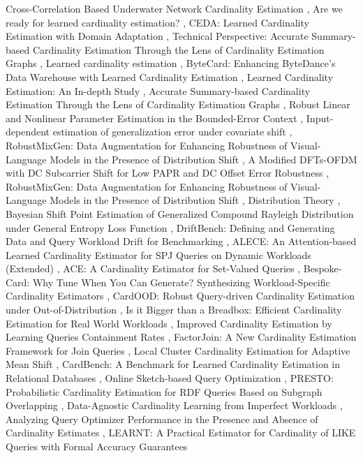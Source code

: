 \documentclass{article}
\begin{document}
Cross-Correlation Based Underwater Network Cardinality Estimation \cite{chowdhury2017optimization73ee3ac7}, Are we ready for learned cardinality estimation? \cite{wang2021readye3852374}, CEDA: Learned Cardinality Estimation with Domain Adaptation \cite{wang2023ceda70dc0332}, Technical Perspective: Accurate Summary-based Cardinality Estimation Through the Lens of Cardinality Estimation Graphs \cite{suciu2023technicale9ac173f}, Learned cardinality estimation \cite{sun2021learnedd25ede72}, ByteCard: Enhancing ByteDance's Data Warehouse with Learned Cardinality Estimation \cite{han2024bytecard9f89583d}, Learned Cardinality Estimation: An In-depth Study \cite{kim2022learnedd43db6c6}, Accurate Summary-based Cardinality Estimation Through the Lens of Cardinality Estimation Graphs \cite{chen2023accurate4a7d0f15}, Robust Linear and Nonlinear Parameter Estimation in the Bounded-Error Context \cite{walter1989robust2a039320}, Input-dependent estimation of generalization error under covariate shift \cite{sugiyama2005inputdependent41f87778}, RobustMixGen: Data Augmentation for Enhancing Robustness of Visual-Language Models in the Presence of Distribution Shift \cite{kim2023robustmixgenf75245e8}, A Modified DFTs-OFDM with DC Subcarrier Shift for Low PAPR and DC Offset Error Robustness \cite{nihei2015modified7cc5e598}, RobustMixGen: Data Augmentation for Enhancing Robustness of Visual-Language Models in the Presence of Distribution Shift \cite{kim2023robustmixgenb9ed7bbc}, Distribution Theory \cite{paper2015distributiond08466cc}, Bayesian Shift Point Estimation of Generalized Compound Rayleigh Distribution under General Entropy Loss Function \cite{srivastava2022bayesian02aadf1c}, DriftBench: Defining and Generating Data and Query Workload Drift for Benchmarking \cite{liu2025driftbench5dd7daaf}, ALECE: An Attention-based Learned Cardinality Estimator for SPJ Queries on Dynamic Workloads (Extended) \cite{li2023alecee0b086c2}, ACE: A Cardinality Estimator for Set-Valued Queries \cite{sheng2025ace126e83fe}, Bespoke-Card: Why Tune When You Can Generate? Synthesizing Workload-Specific Cardinality Estimators \cite{wehrstein2026bespokecard67eca848}, CardOOD: Robust Query-driven Cardinality Estimation under Out-of-Distribution \cite{li2024cardood5445da56}, Is it Bigger than a Breadbox: Efficient Cardinality Estimation for Real World Workloads \cite{yi2025biggerc72009ed}, Improved Cardinality Estimation by Learning Queries Containment Rates \cite{hayek2019improved85d5530b}, FactorJoin: A New Cardinality Estimation Framework for Join Queries \cite{wu2022factorjoin504d6745}, Local Cluster Cardinality Estimation for Adaptive Mean Shift \cite{pepin2025local4cd49e00}, CardBench: A Benchmark for Learned Cardinality Estimation in Relational Databases \cite{chronis2024cardbenchb699082d}, Online Sketch-based Query Optimization \cite{izenov2021online44631ec6}, PRESTO: Probabilistic Cardinality Estimation for RDF Queries Based on Subgraph Overlapping \cite{wang2018presto99935f37}, Data-Agnostic Cardinality Learning from Imperfect Workloads \cite{wu2025dataagnosticeb927f1b}, Analyzing Query Optimizer Performance in the Presence and Absence of Cardinality Estimates \cite{datta2023analyzingbd29a320}, LEARNT: A Practical Estimator for Cardinality of LIKE Queries with Formal Accuracy Guarantees 
\end{document}
